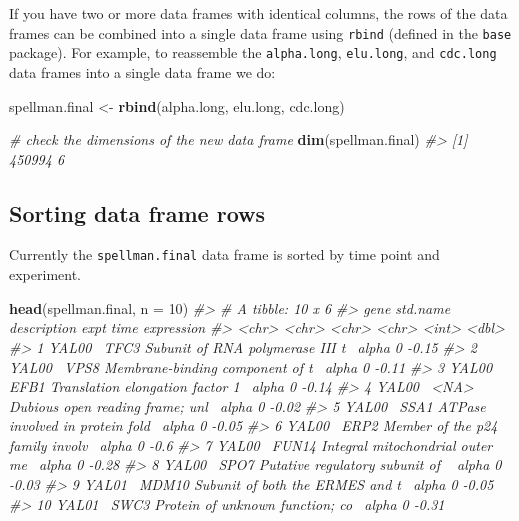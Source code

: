 \documentclass[]{book}
\newenvironment{Shaded}{\begin{snugshade}}{\end{snugshade}}
\newcommand{\CommentTok}[1]{\textcolor[rgb]{0.56,0.35,0.01}{\textit{#1}}}
\newcommand{\DataTypeTok}[1]{\textcolor[rgb]{0.13,0.29,0.53}{#1}}
\newcommand{\DecValTok}[1]{\textcolor[rgb]{0.00,0.00,0.81}{#1}}
\newcommand{\KeywordTok}[1]{\textcolor[rgb]{0.13,0.29,0.53}{\textbf{#1}}}
\newcommand{\NormalTok}[1]{#1}
\newcommand{\StringTok}[1]{\textcolor[rgb]{0.31,0.60,0.02}{#1}}
\theoremstyle{definition}
\theoremstyle{definition}
\theoremstyle{definition}
\theoremstyle{remark}
\begin{document}
If you have two or more data frames with identical columns, the rows of
the data frames can be combined into a single data frame using
\texttt{rbind} (defined in the \texttt{base} package). For example, to
reassemble the \texttt{alpha.long}, \texttt{elu.long}, and
\texttt{cdc.long} data frames into a single data frame we do:

\begin{Shaded}
\begin{Highlighting}[]
\NormalTok{spellman.final <-}\StringTok{ }\KeywordTok{rbind}\NormalTok{(alpha.long, elu.long, cdc.long)}

\CommentTok{# check the dimensions of the new data frame}
\KeywordTok{dim}\NormalTok{(spellman.final)}
\CommentTok{#> [1] 450994      6}
\end{Highlighting}
\end{Shaded}

\hypertarget{sorting-data-frame-rows}{%
\subsection{Sorting data frame rows}\label{sorting-data-frame-rows}}

Currently the \texttt{spellman.final} data frame is sorted by time point
and experiment.

\begin{Shaded}
\begin{Highlighting}[]
\KeywordTok{head}\NormalTok{(spellman.final, }\DataTypeTok{n =} \DecValTok{10}\NormalTok{)}
\CommentTok{#> # A tibble: 10 x 6}
\CommentTok{#>    gene   std.name description                      expt   time expression}
\CommentTok{#>    <chr>  <chr>    <chr>                            <chr> <int>      <dbl>}
\CommentTok{#>  1 YAL00~ TFC3     Subunit of RNA polymerase III t~ alpha     0      -0.15}
\CommentTok{#>  2 YAL00~ VPS8     Membrane-binding component of t~ alpha     0      -0.11}
\CommentTok{#>  3 YAL00~ EFB1     Translation elongation factor 1~ alpha     0      -0.14}
\CommentTok{#>  4 YAL00~ <NA>     Dubious open reading frame; unl~ alpha     0      -0.02}
\CommentTok{#>  5 YAL00~ SSA1     ATPase involved in protein fold~ alpha     0      -0.05}
\CommentTok{#>  6 YAL00~ ERP2     Member of the p24 family involv~ alpha     0      -0.6 }
\CommentTok{#>  7 YAL00~ FUN14    Integral mitochondrial outer me~ alpha     0      -0.28}
\CommentTok{#>  8 YAL00~ SPO7     Putative regulatory subunit of ~ alpha     0      -0.03}
\CommentTok{#>  9 YAL01~ MDM10    Subunit of both the ERMES and t~ alpha     0      -0.05}
\CommentTok{#> 10 YAL01~ SWC3     Protein of unknown function; co~ alpha     0      -0.31}
\end{Highlighting}
\end{Shaded}
\end{document}
